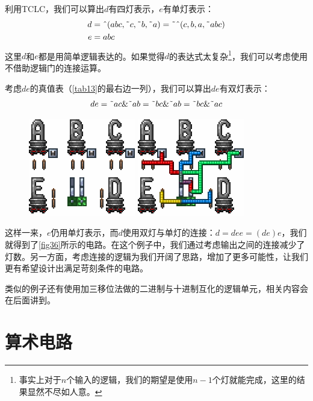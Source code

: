\begin{solution}
利用TCLC，我们可以算出$d$有四灯表示，$e$有单灯表示：
\begin{align*}
d&=\textnormal{\^{}}(abc,\textnormal{\~{}}c,\textnormal{\~{}}b,\textnormal{\~{}}a)=\textnormal{\~{}}\textnormal{\^{}}(c,b,a,\textnormal{\~{}}abc)\\
e&=abc
\end{align*}
这里$d$和$e$都是用简单逻辑表达的。如果觉得$d$的表达式太复杂\footnote{事实上对于$n$个输入的逻辑，我们的期望是使用$n-1$个灯就能完成，这里的结果显然不尽如人意。}，我们可以考虑使用不借助逻辑门的连接运算。

考虑$de$的真值表（\autoref{tab13}的最右边一列），我们可以算出$de$有双灯表示：
$$de=\textnormal{\~{}}ac\&\textnormal{\~{}}ab=\textnormal{\~{}}bc\&\textnormal{\~{}}ab=\textnormal{\~{}}bc\&\textnormal{\~{}}ac$$

\begin{figure}[!ht]
\centering
\includegraphics{images/406.png}
\qquad
\includegraphics{images/407.png}
\caption{}\label{fig36}
\end{figure}

这样一来，$e$仍用单灯表示，而$d$使用双灯与单灯的连接：$d=dee=(de)e$，我们就得到了\autoref{fig36}所示的电路。在这个例子中，我们通过考虑输出之间的连接减少了灯数。另一方面，考虑连接的逻辑为我们开阔了思路，增加了更多可能性，让我们更有希望设计出满足苛刻条件的电路。
\end{solution}

类似的例子还有使用加三移位法做的二进制与十进制互化的逻辑单元，相关内容会在后面讲到。

\section{算术电路}\label{sec34}

